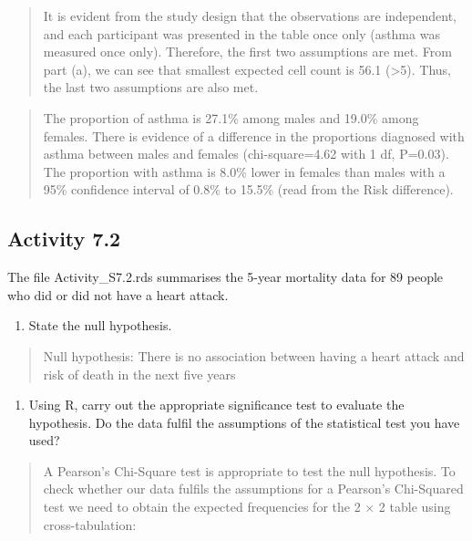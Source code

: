 \documentclass[
]{memoir}
\providecommand{\tightlist}{%
  \setlength{\itemsep}{0pt}\setlength{\parskip}{0pt}}
\begin{document}
\begin{quote}
It is evident from the study design that the observations are independent, and each participant was presented in the table once only (asthma was measured once only). Therefore, the first two assumptions are met. From part (a), we can see that smallest expected cell count is 56.1 (\textgreater5). Thus, the last two assumptions are also met.
\end{quote}

\begin{quote}
The proportion of asthma is 27.1\% among males and 19.0\% among females. There is evidence of a difference in the proportions diagnosed with asthma between males and females (chi-square=4.62 with 1 df, P=0.03). The proportion with asthma is 8.0\% lower in females than males with a 95\% confidence interval of 0.8\% to 15.5\% (read from the Risk difference).
\end{quote}

\hypertarget{activity-7.2}{%
\subsection*{Activity 7.2}\label{activity-7.2}}

The file Activity\_S7.2.rds summarises the 5-year mortality data for 89 people who did or did not have a heart attack.

\begin{enumerate}
\def\labelenumi{\alph{enumi})}
\tightlist
\item
  State the null hypothesis.
\end{enumerate}

\begin{quote}
Null hypothesis: There is no association between having a heart attack and risk of death in the next five years
\end{quote}

\begin{enumerate}
\def\labelenumi{\alph{enumi})}
\setcounter{enumi}{1}
\tightlist
\item
  Using R, carry out the appropriate significance test to evaluate the hypothesis. Do the data fulfil the assumptions of the statistical test you have used?
\end{enumerate}

\begin{quote}
A Pearson's Chi-Square test is appropriate to test the null hypothesis. To check whether our data fulfils the assumptions for a Pearson's Chi-Squared test we need to obtain the expected frequencies for the 2 × 2 table using cross-tabulation:
\end{quote}
\end{document}
